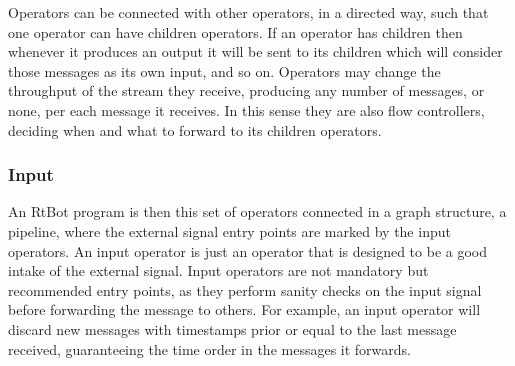 \documentclass[preprint,1p,times]{elsarticle}
\begin{document}
Operators can be connected with other operators, in a directed way, such that one 
operator can have children operators. If an operator has children then whenever it 
produces an output it will be sent to its children which will consider those 
messages as its own input, and so on. Operators may change the throughput of the 
stream they receive, producing any number of messages, or none, per each message 
it receives. In this sense they are also flow controllers, deciding when and what 
to forward to its children operators.


\subsubsection{Input}
An RtBot program is then this set of operators connected in a graph structure, 
a pipeline, where the external signal entry points are marked by the input 
operators. An input operator is just an operator that is designed to be a good 
intake of the external signal. Input operators are not mandatory but recommended 
entry points, as they perform sanity checks on the input signal before forwarding 
the message to others. For example, an input operator will discard new messages 
with timestamps prior or equal to the last message received, guaranteeing the time 
order in the messages it forwards.
\end{document}
